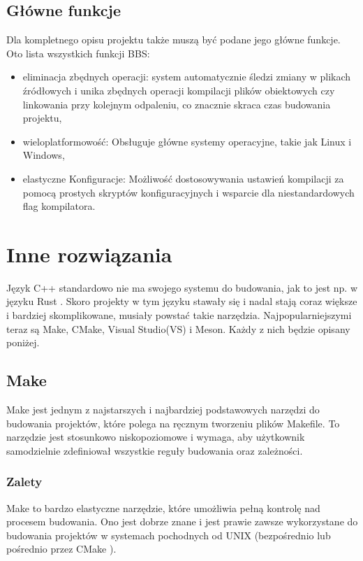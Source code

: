\subsection{Główne funkcje}
Dla kompletnego opisu projektu także muszą być podane jego główne funkcje. Oto lista wszystkich funkcji BBS:

\begin{itemize}
    \item eliminacja zbędnych operacji: system automatycznie śledzi zmiany w plikach źródłowych i unika zbędnych operacji kompilacji plików obiektowych czy linkowania przy kolejnym odpaleniu, co znacznie skraca czas budowania projektu,
    \item wieloplatformowość: Obsługuje główne systemy operacyjne, takie jak Linux i Windows,
    \item elastyczne Konfiguracje: Możliwość dostosowywania ustawień kompilacji za pomocą prostych skryptów konfiguracyjnych i wsparcie dla niestandardowych flag kompilatora.
\end{itemize}

\section{Inne rozwiązania}
Język C++ standardowo nie ma swojego systemu do budowania, jak to jest np. w języku Rust \cite{rust-cargo}. Skoro projekty w tym języku stawały się i nadal stają coraz większe i bardziej skomplikowane, musiały powstać takie narzędzia. Najpopularniejszymi teraz są Make, CMake, Visual Studio(VS) i Meson. Każdy z nich będzie opisany poniżej.

\subsection{Make}
Make\cite{make} jest jednym z najstarszych i najbardziej podstawowych narzędzi do budowania projektów, które polega na ręcznym tworzeniu plików Makefile. To narzędzie jest stosunkowo niskopoziomowe i wymaga, aby użytkownik samodzielnie zdefiniował wszystkie reguły budowania oraz zależności.

\subsubsection{Zalety}
Make to bardzo elastyczne narzędzie, które umożliwia pełną kontrolę nad procesem budowania. Ono jest dobrze znane i jest prawie zawsze wykorzystane do budowania projektów w systemach pochodnych od UNIX (bezpośrednio lub pośrednio przez CMake \cite{cmake}). 

